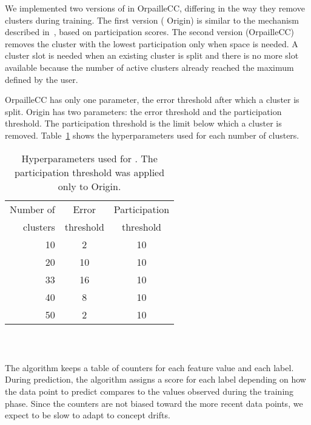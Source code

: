 We implemented two versions of \mcnn in
OrpailleCC, differing in the way they remove
clusters during training. The first version (\mcnn
Origin) is similar to the mechanism described
in~\cite{mc-nn}, based on participation scores.
The second version (\mcnn OrpailleCC)
removes the cluster with the lowest participation
only when space is needed.  A cluster slot is
needed when an existing cluster is split and there
is no more slot available because the number of
active clusters already reached the maximum defined
by the user.

\mcnn OrpailleCC has only one
parameter, the error threshold after which a
cluster is split.  \mcnn Origin has two
parameters: the error threshold and the
participation threshold. The participation
threshold is the limit below which a cluster is
removed.
Table~\ref{table:hyperparameter-mcnn} shows
the hyperparameters used for each number of
clusters. 
\begin{table}
		\begin{center}
			\begin{tabular}{|| r | c | c ||} 
				\hline
					Number of &  Error & Participation\\ [0.5ex] 
					clusters & threshold & threshold\\[0.5ex]
				\hline\hline
					10 & 2 & 10\\
					20 & 10 & 10\\
					33 & 16 & 10\\
					40 & 8 & 10\\
					50 & 2 & 10\\
				\hline
			\end{tabular}
		\end{center}
		\caption{Hyperparameters used for \mcnn. The
		participation threshold was applied only to
		\mcnn Origin.}
		\label{table:hyperparameter-mcnn}
\end{table}

\subsubsection{\naivebayes~\cite{naive_bayes}}
The \naivebayes algorithm keeps a table of
counters for each feature value and each label.
During prediction, the algorithm assigns a
score for each label depending on how the data
point to predict compares to the values observed
during the training phase. Since the counters are
not biased toward the more recent data points, we
expect \naivebayes to be slow to adapt to concept drifts. 

